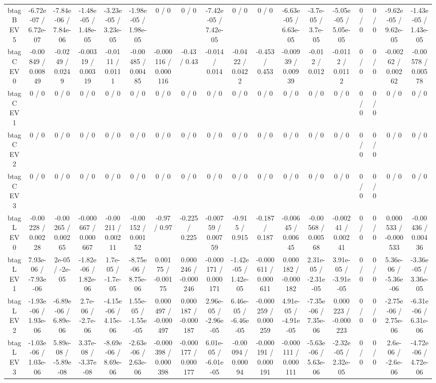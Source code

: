 \documentclass[10pt]{article}
\begin{document}
\begin{table}[htbp]
\begin{center}
\begin{tabular}{|c|c|c|c|c|c|c|c|c|c|c|c|c|c|c|c|c|c|}
  btag B EV 5 & -6.72e-07 / 6.72e-07 & -7.84e-06 / 7.84e-06 & -1.48e-05 / 1.48e-05 & -3.23e-05 / 3.23e-05 & -1.98e-05 / 1.98e-05 & 0 / 0 & 0 / 0 & -7.42e-05 / 7.42e-05 & 0 / 0 & 0 / 0 & -6.63e-05 / 6.63e-05 & -3.7e-05 / 3.7e-05 & -5.05e-05 / 5.05e-05 & 0 / 0 & 0 / 0 & -9.62e-05 / 9.62e-05 & -1.43e-05 / 1.43e-05 \\ 
  btag C EV 0 & -0.00849 / 0.00849 & -0.0249 / 0.0249 & -0.00319 / 0.00319 & -0.0111 / 0.0111 & -0.00485 / 0.00485 & -0.000116 / 0.000116 & -0.43 / 0.43 & -0.014 / 0.014 & -0.0422 / 0.0422 & -0.453 / 0.453 & -0.00939 / 0.00939 & -0.012 / 0.012 & -0.0112 / 0.0112 & 0 / 0 & 0 / 0 & -0.00262 / 0.00262 & -0.00578 / 0.00578 \\ 
  btag C EV 1 & 0 / 0 & 0 / 0 & 0 / 0 & 0 / 0 & 0 / 0 & 0 / 0 & 0 / 0 & 0 / 0 & 0 / 0 & 0 / 0 & 0 / 0 & 0 / 0 & 0 / 0 & 0 / 0 & 0 / 0 & 0 / 0 & 0 / 0 \\ 
  btag C EV 2 & 0 / 0 & 0 / 0 & 0 / 0 & 0 / 0 & 0 / 0 & 0 / 0 & 0 / 0 & 0 / 0 & 0 / 0 & 0 / 0 & 0 / 0 & 0 / 0 & 0 / 0 & 0 / 0 & 0 / 0 & 0 / 0 & 0 / 0 \\ 
  btag C EV 3 & 0 / 0 & 0 / 0 & 0 / 0 & 0 / 0 & 0 / 0 & 0 / 0 & 0 / 0 & 0 / 0 & 0 / 0 & 0 / 0 & 0 / 0 & 0 / 0 & 0 / 0 & 0 / 0 & 0 / 0 & 0 / 0 & 0 / 0 \\ 
  btag L EV 0 & -0.00228 / 0.00228 & -0.00265 / 0.00265 & -0.000667 / 0.000667 & -0.00211 / 0.00211 & -0.00152 / 0.00152 & -0.97 / 0.97 & -0.225 / 0.225 & -0.00759 / 0.00759 & -0.915 / 0.915 & -0.187 / 0.187 & -0.00645 / 0.00645 & -0.00568 / 0.00568 & -0.00241 / 0.00241 & 0 / 0 & 0 / 0 & 0.000533 / -0.000533 & -0.00436 / 0.00436 \\ 
  btag L EV 1 & 7.93e-06 / -7.93e-06 & 2e-05 / -2e-05 & -1.82e-06 / 1.82e-06 & 1.7e-05 / -1.7e-05 & -8.75e-06 / 8.75e-06 & 0.00175 / -0.00175 & 0.000246 / -0.000246 & -0.000171 / 0.000171 & -1.42e-05 / 1.42e-05 & -0.000611 / 0.000611 & 0.000182 / -0.000182 & 2.31e-05 / -2.31e-05 & 3.91e-05 / -3.91e-05 & 0 / 0 & 0 / 0 & 5.36e-06 / -5.36e-06 & -3.36e-05 / 3.36e-05 \\ 
  btag L EV 2 & -1.93e-06 / 1.93e-06 & -6.89e-06 / 6.89e-06 & 2.7e-06 / -2.7e-06 & -4.15e-06 / 4.15e-06 & 1.55e-05 / -1.55e-05 & 0.000497 / -0.000497 & 0.000187 / -0.000187 & 2.96e-05 / -2.96e-05 & 6.46e-05 / -6.46e-05 & -0.000259 / 0.000259 & 4.91e-05 / -4.91e-05 & -7.35e-06 / 7.35e-06 & 0.000223 / -0.000223 & 0 / 0 & 0 / 0 & -2.75e-06 / 2.75e-06 & -6.31e-06 / 6.31e-06 \\ 
  btag L EV 3 & -1.03e-06 / 1.03e-06 & 5.89e-08 / -5.89e-08 & 3.37e-08 / -3.37e-08 & -8.69e-06 / 8.69e-06 & -2.63e-06 / 2.63e-06 & -0.000398 / 0.000398 & -0.000177 / 0.000177 & 6.01e-05 / -6.01e-05 & -0.00094 / 0.00094 & -0.000191 / 0.000191 & -0.000111 / 0.000111 & -5.63e-06 / 5.63e-06 & -2.32e-05 / 2.32e-05 & 0 / 0 & 0 / 0 & 2.6e-06 / -2.6e-06 & -4.72e-06 / 4.72e-06 \\ 

\end{tabular}
\end{center}
\end{table}
\end{document}
